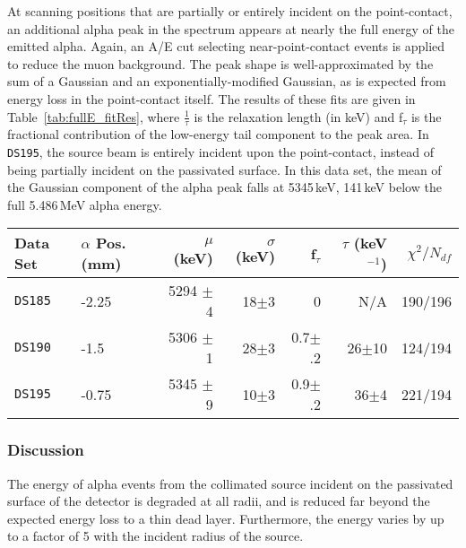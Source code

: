 \documentclass[groupedaddress,rmp,amsmath,amssymb,bibnotes,altaffilletter,twocolumn]{revtex4-1}
\begin{document}
At scanning positions that are partially or entirely incident on the point-contact, an additional alpha peak in the spectrum appears at nearly the full energy of the emitted alpha. Again, an A/E cut selecting near-point-contact events is applied to reduce the muon background. The peak shape is well-approximated by the sum of a Gaussian and an exponentially-modified Gaussian, as is expected from energy loss in the point-contact itself. The results of these fits are given in Table~\ref{tab:fullE_fitRes}, where $\frac{1}{\tau}$ is the relaxation length (in keV) and  f$_{\tau}$ is the fractional contribution of the low-energy tail component to the peak area. In {\tt DS195}, the source beam is entirely incident upon the point-contact, instead of being partially incident on the passivated surface. In this data set, the mean of the Gaussian component of the alpha peak falls at 5345\,keV, 141\,keV below the full 5.486\,MeV alpha energy. 

\begin{table*}[]
\begin{center}
\begin{tabular}{l l r r r r r}
Data Set & $\alpha$ Pos. (mm) & $\mu$ (keV) & $\sigma$ (keV) & f$_{\tau}$ & $\tau$ (keV$^{-1}$)& $\chi^2/N_{df}$ \\  \hline
{\tt DS185} & -2.25 & 5294 $\pm$4 & 18$\pm$3 & 0 & N/A & 190/196 \\
{\tt DS190} & -1.5 & 5306 $\pm$1 & 28$\pm$3 & 0.7$\pm$.2 & 26$\pm$10 & 124/194 \\
{\tt DS195} & -0.75 & 5345 $\pm$9 & 10$\pm$3 & 0.9$\pm$.2 & 36$\pm$4 & 221/194 \\
\end{tabular}
\caption{The results of a Gaussian+low energy tail peak shape fit to the energy of alphas incident on the point-contact. Due to the low point-contact alpha rate in {\tt DS185}, the tail component in this spectrum fits to 0. All data sets taken at each position are combined to determine these results.} \label{tab:fullE_fitRes}
\end{center}
\end{table*}

\subsubsection{Discussion}
The energy of alpha events from the collimated source incident on the passivated surface of the detector is degraded at all radii, and is reduced far beyond the expected energy loss to a thin dead layer. Furthermore, the energy varies by up to a factor of 5 with the incident radius of the source. 
\end{document}
